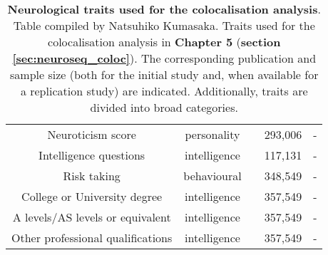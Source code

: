 \begin{table}[h]
\begin{tabular}{c c c c c}
    Neuroticism score & personality & \cite{neale2018gwas} & 293,006 & - \\
    Intelligence questions\footnotemark & intelligence & \cite{neale2018gwas} & 117,131 & -\\
    Risk taking & behavioural & \cite{neale2018gwas} & 348,549 & -\\
    College or University degree & intelligence & \cite{neale2018gwas} & 357,549 & - \\
    A levels/AS levels or equivalent & intelligence & \cite{neale2018gwas} & 357,549 & -\\
    Other professional qualifications  & intelligence & \cite{neale2018gwas} & 357,549 & -\\
    \end{tabular}
    \caption[Neurological traits used for the colocalisation analysis]{\textbf{Neurological traits used for the colocalisation analysis}.\\
    Table compiled by Natsuhiko Kumasaka.
    Traits used for the colocalisation analysis in \textbf{Chapter 5} (\textbf{section \ref{sec:neuroseq_coloc}}).
    The corresponding publication and sample size (both for the initial study and, when available for a replication study) are indicated.
    Additionally, traits are divided into broad categories.}
    \label{tab:coloc_neuro_traits}
\end{table}









